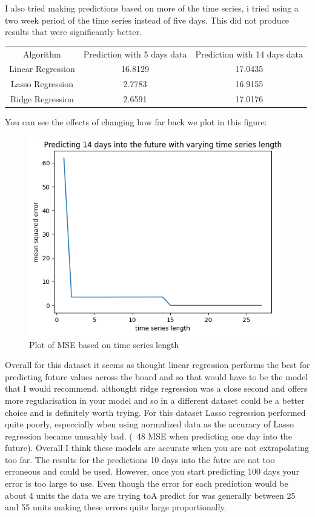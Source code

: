 \documentclass{report}
\begin{document}
I also tried making predictions based on more of the time series, i tried using a two week period of the time series instead of five days. This did not produce results that were significantly better.

\begin{minipage} {\linewidth}
\bigskip
\centering
{}
\begin{tabular}{c c c}
    Algorithm & Prediction with 5 days data & Prediction with 14 days data \\
    Linear Regression & 16.8129 & 17.0435\\
    Lasso Regression & 2.7783 & 16.9155\\
    Ridge Regression & 2.6591 & 17.0176
\end{tabular}
\bigskip
\end{minipage}

You can see the effects of changing how far back we plot in this figure:

\begin{figure}
    \caption{Plot of MSE based on time series length}
    \centering
    \includegraphics{varying_length_plot.png}
\end{figure}

Overall for this dataset it seems as thought linear regression performs the best for predicting future values across the board and so that would have to be the model that I would recommend. althought ridge regression was a close second and offers more regularisation in your model and so in a different dataset could be a better choice and is definitely worth trying.
For this dataset Lasso regression performed quite poorly, especcially when using normalized data as the accuracy of Lasso regression became unusably bad. (~48 MSE when predicting one day into the future).
Overall I think these models are accurate when you are not extrapolating too far. The results for the predictions 10 days into the futre are not too erroneous and could be used. However, once you start predicting 100 days your error is too large to use. Even though the error for each prediction would be about 4 units the data we are trying toA predict for was generally between 25 and 55 units making these errors quite large proportionally.
\end{document}
